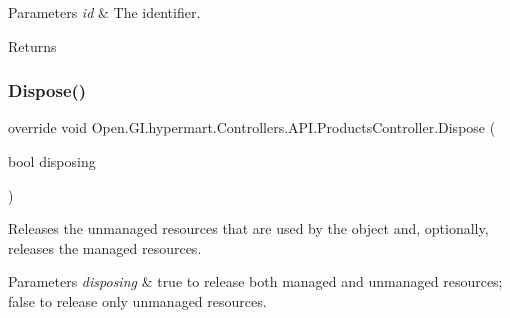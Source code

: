 \begin{DoxyParams}{Parameters}
{\em id} & The identifier.\\
\hline
\end{DoxyParams}
\begin{DoxyReturn}{Returns}

\end{DoxyReturn}
\hypertarget{class_open_1_1_g_i_1_1hypermart_1_1_controllers_1_1_a_p_i_1_1_products_controller_a4e48b5e7914c88c15e1187ef6bfb1e09}{}\label{class_open_1_1_g_i_1_1hypermart_1_1_controllers_1_1_a_p_i_1_1_products_controller_a4e48b5e7914c88c15e1187ef6bfb1e09} 
\subsubsection{\texorpdfstring{Dispose()}{Dispose()}}
{\footnotesize\ttfamily override void Open.\+G\+I.\+hypermart.\+Controllers.\+A\+P\+I.\+Products\+Controller.\+Dispose (\begin{DoxyParamCaption}\item[{bool}]{disposing }\end{DoxyParamCaption})\hspace{0.3cm}{\ttfamily [protected]}}



Releases the unmanaged resources that are used by the object and, optionally, releases the managed resources. 


\begin{DoxyParams}{Parameters}
{\em disposing} & true to release both managed and unmanaged resources; false to release only unmanaged resources.\\
\hline
\end{DoxyParams}
\hypertarget{class_open_1_1_g_i_1_1hypermart_1_1_controllers_1_1_a_p_i_1_1_products_controller_a68f971a94461093b48568e4f6f38393c}{}\label{class_open_1_1_g_i_1_1hypermart_1_1_controllers_1_1_a_p_i_1_1_products_controller_a68f971a94461093b48568e4f6f38393c} 
